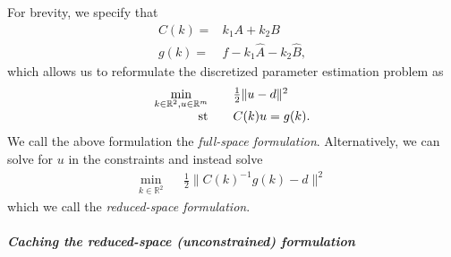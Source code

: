 \documentclass{report}
\newcommand{\re}{\mathbb{R}}
\newcommand{\st}{\textnormal{st}}
\begin{document}
For brevity, we specify that
\begin{align*}
    C(k) =& k_1 A + k_2 B\\
    g(k) =& f-k_1\hat{A}-k_2\hat{B},
\end{align*}
which allows us to reformulate the discretized parameter estimation problem as  
$$\begin{array}{rcl}
        \min\limits_{k\in\re^2,u\in\re^m}  && \frac{1}{2} \| u - d \|^2 \\
        \st && C(k)u = g(k).
\end{array}$$
We call the above formulation the \textit{full-space formulation}.  Alternatively, we can solve for $u$ in the constraints and instead solve
$$\begin{array}{rcl}
        \min\limits_{k\in\re^2}  && \frac{1}{2} \| C(k)^{-1}g(k) - d \|^2
\end{array}$$
which we call the \textit{reduced-space formulation}. 

\subparagraph{Caching the reduced-space (unconstrained) formulation}\mbox{}\\
\end{document}
